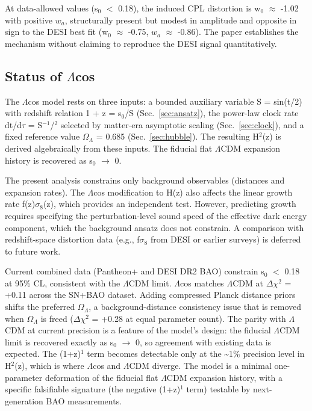 At data-allowed values (s$_0$ $<$ 0.18), the induced CPL distortion
is w$_0$ $\approx$ -1.02 with positive $w_a$, structurally present but modest in
amplitude and opposite in sign to the DESI best fit (w$_0$ $\approx$ -0.75, $w_a$ $\approx$
-0.86). The paper establishes the mechanism without claiming to
reproduce the DESI signal quantitatively.

\subsection{Status of $\Lambda$cos}\label{sec:disc-status}

The $\Lambda$cos model rests on three inputs: a bounded auxiliary variable S =
sin(t/2) with redshift relation 1 + z = s$_0$/S (Sec.~\ref{sec:ansatz}), the power-law clock
rate dt/d$\tau$ = S$^{-1}$/$^2$ selected by matter-era asymptotic scaling (Sec.~\ref{sec:clock}), and
a fixed reference value $\Omega_\Lambda$ = 0.685 (Sec.~\ref{sec:hubble}). The resulting H$^2$(z) is
derived algebraically from these inputs. The fiducial flat $\Lambda$CDM
expansion history is recovered as s$_0$ $\to$ 0.

The present analysis constrains only background observables (distances
and expansion rates). The $\Lambda$cos modification to H(z) also affects the
linear growth rate f(z)$\sigma_8$(z), which provides an independent test.
However, predicting growth requires specifying the perturbation-level
sound speed of the effective dark energy component, which the background
ansatz does not constrain. A comparison with redshift-space distortion
data (e.g., f$\sigma_8$ from DESI or earlier surveys) is deferred to future
work.

Current combined data (Pantheon+ and DESI DR2 BAO) constrain s$_0$
$<$ 0.18 at 95\% CL, consistent with the $\Lambda$CDM limit. $\Lambda$cos
matches $\Lambda$CDM at $\Delta\chi^2$ = +0.11 across the SN+BAO dataset. Adding compressed
Planck distance priors shifts the preferred $\Omega_\Lambda$, a background-distance
consistency issue that is removed when $\Omega_\Lambda$ is freed ($\Delta\chi^2$ = +0.28 at
equal parameter count). The parity with $\Lambda$CDM at current precision is a
feature of the model's design: the fiducial $\Lambda$CDM limit is recovered
exactly as s$_0$ $\to$ 0, so agreement with existing data is expected. The
(1+z)$^1$ term becomes detectable only at the \textasciitilde1\% precision
level in H$^2$(z), which is where $\Lambda$cos and $\Lambda$CDM diverge. The model is a
minimal one-parameter deformation of the fiducial flat $\Lambda$CDM expansion
history, with a specific falsifiable signature (the negative (1+z)$^1$
term) testable by next-generation BAO measurements.

